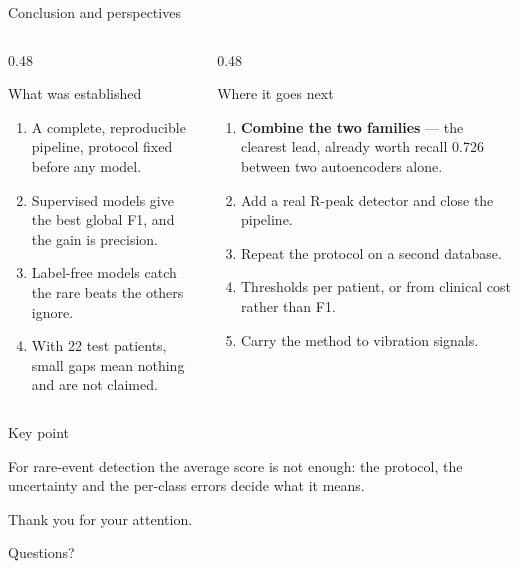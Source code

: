 \documentclass[aspectratio=169,10pt]{beamer}
\newcommand{\keypoint}[1]{%
  \vspace{0.4em}
  \begin{alertblock}{Key point}
    #1
  \end{alertblock}
}
\begin{document}
\begin{frame}{Conclusion and perspectives}

  \begin{columns}[T]

    \begin{column}{0.48\textwidth}
      \begin{block}{What was established}
        \begin{enumerate}
          \item A complete, reproducible pipeline, protocol fixed before any model.
          \item Supervised models give the best global F1, and the gain is precision.
          \item Label-free models catch the rare beats the others ignore.
          \item With 22 test patients, small gaps mean nothing and are not claimed.
        \end{enumerate}
      \end{block}
    \end{column}

    \begin{column}{0.48\textwidth}
      \begin{block}{Where it goes next}
        \begin{enumerate}
          \item \textbf{Combine the two families} --- the clearest lead, already worth
            recall 0.726 between two autoencoders alone.
          \item Add a real R-peak detector and close the pipeline.
          \item Repeat the protocol on a second database.
          \item Thresholds per patient, or from clinical cost rather than F1.
          \item Carry the method to vibration signals.
        \end{enumerate}
      \end{block}
    \end{column}

  \end{columns}

  \keypoint{
  For rare-event detection the average score is not enough: the protocol, the
  uncertainty and the per-class errors decide what it means.}

\end{frame}


\begin{frame}[standout]
  Thank you for your attention.

  \vspace{1em}

  Questions?
\end{frame}
\end{document}
